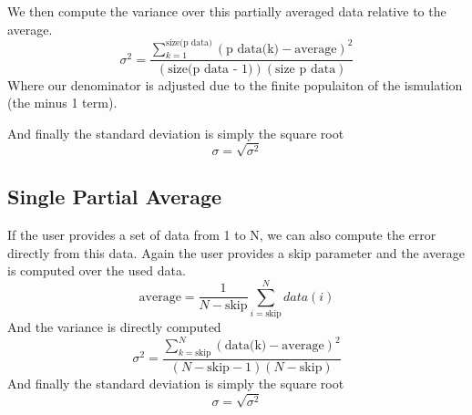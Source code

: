 \documentclass{article}
\newcommand{\be}{\begin{equation}}
\newcommand{\ee}{\end{equation}}
\begin{document}
We then compute the variance over this partially averaged data relative to the average. 
\be
\sigma^2 = \frac{\sum_{k=1}^{\text{size(p data)}} \left(\text{p data(k)} - \text{average}\right)^2}{(\text{size(p data - 1)})(\text{size p data})}
\ee
Where our denominator is adjusted due to the finite populaiton of the ismulation (the minus 1 term). 

And finally the standard deviation is simply the square root
\be
\sigma = \sqrt{\sigma^2}
\ee

\subsection*{Single Partial Average}
If the user provides a set of data from 1 to N, we can also compute the error directly from this data.
Again the user provides a skip parameter and the average is computed over the used data. 
\be
\text{average} = \frac{1}{N-\text{skip}} \sum_{i=\text{skip}}^N data(i)
\ee
And the variance is directly computed
\be
\sigma^2 = \frac{\sum_{k=\text{skip}}^{N} \left(\text{data(k)} - \text{average}\right)^2}{(N-\text{skip}-1)(N-\text{skip})}
\ee
And finally the standard deviation is simply the square root
\be
\sigma = \sqrt{\sigma^2}
\ee
\end{document}
